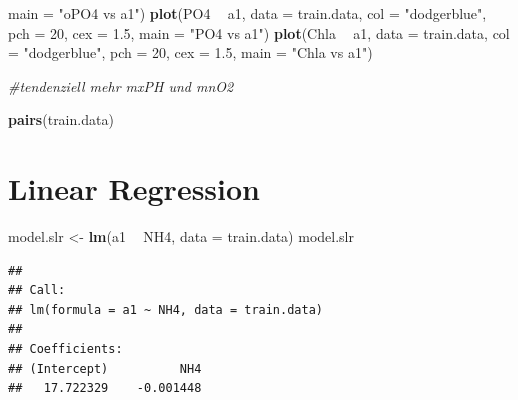 \documentclass[]{report}
\newenvironment{Shaded}{\begin{snugshade}}{\end{snugshade}}
\newcommand{\KeywordTok}[1]{\textcolor[rgb]{0.13,0.29,0.53}{\textbf{#1}}}
\newcommand{\DataTypeTok}[1]{\textcolor[rgb]{0.13,0.29,0.53}{#1}}
\newcommand{\DecValTok}[1]{\textcolor[rgb]{0.00,0.00,0.81}{#1}}
\newcommand{\FloatTok}[1]{\textcolor[rgb]{0.00,0.00,0.81}{#1}}
\newcommand{\StringTok}[1]{\textcolor[rgb]{0.31,0.60,0.02}{#1}}
\newcommand{\CommentTok}[1]{\textcolor[rgb]{0.56,0.35,0.01}{\textit{#1}}}
\newcommand{\OperatorTok}[1]{\textcolor[rgb]{0.81,0.36,0.00}{\textbf{#1}}}
\newcommand{\NormalTok}[1]{#1}
\begin{document}
\begin{Shaded}
\begin{Highlighting}[]
     \DataTypeTok{main =} \StringTok{"oPO4 vs a1"}\NormalTok{)}
\KeywordTok{plot}\NormalTok{(PO4 }\OperatorTok{~}\StringTok{ }\NormalTok{a1, }\DataTypeTok{data =}\NormalTok{ train.data, }\DataTypeTok{col =} \StringTok{"dodgerblue"}\NormalTok{, }\DataTypeTok{pch =} \DecValTok{20}\NormalTok{, }\DataTypeTok{cex =} \FloatTok{1.5}\NormalTok{,}
     \DataTypeTok{main =} \StringTok{"PO4 vs a1"}\NormalTok{)}
\KeywordTok{plot}\NormalTok{(Chla }\OperatorTok{~}\StringTok{ }\NormalTok{a1, }\DataTypeTok{data =}\NormalTok{ train.data, }\DataTypeTok{col =} \StringTok{"dodgerblue"}\NormalTok{, }\DataTypeTok{pch =} \DecValTok{20}\NormalTok{, }\DataTypeTok{cex =} \FloatTok{1.5}\NormalTok{,}
     \DataTypeTok{main =} \StringTok{"Chla vs a1"}\NormalTok{)}

\CommentTok{#tendenziell mehr mxPH und mnO2}

\KeywordTok{pairs}\NormalTok{(train.data)}
\end{Highlighting}
\end{Shaded}

\section{Linear Regression}\label{linear-regression-1}

\begin{Shaded}
\begin{Highlighting}[]
\NormalTok{model.slr <-}\StringTok{ }\KeywordTok{lm}\NormalTok{(a1 }\OperatorTok{~}\StringTok{ }\NormalTok{NH4, }\DataTypeTok{data =}\NormalTok{ train.data)}
\NormalTok{model.slr}
\end{Highlighting}
\end{Shaded}

\begin{verbatim}
## 
## Call:
## lm(formula = a1 ~ NH4, data = train.data)
## 
## Coefficients:
## (Intercept)          NH4  
##   17.722329    -0.001448
\end{verbatim}

\begin{Shaded}
\end{Shaded}
\end{document}

